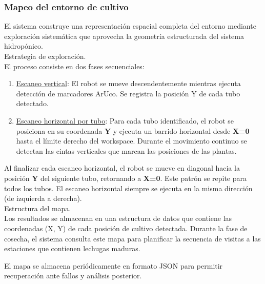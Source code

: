 \subsubsection{Mapeo del entorno de cultivo}

El sistema construye una representación espacial completa del entorno mediante exploración sistemática que aprovecha la geometría estructurada del sistema hidropónico.\\

Estrategia de exploración.\\
\noindent 
El proceso consiste en dos fases secuenciales:

\begin{enumerate}
    \item \underline{Escaneo vertical}: El robot se mueve descendentemente mientras ejecuta detección de marcadores ArUco. Se registra la posición Y de cada tubo detectado.

    \item \underline{Escaneo horizontal por tubo}: Para cada tubo identificado, el robot se posiciona en su coordenada \textbf{Y} y ejecuta un barrido horizontal desde \textbf{X=0} hasta el límite derecho del workspace. Durante el movimiento continuo se detectan las cintas verticales que marcan las posiciones de las plantas.
\end{enumerate}

Al finalizar cada escaneo horizontal, el robot se mueve en diagonal hacia la posición \textbf{Y} del siguiente tubo, retornando a \textbf{X=0}. Este patrón se repite para todos los tubos. El escaneo horizontal siempre se ejecuta en la misma dirección (de izquierda a derecha).\\

Estructura del mapa.\\
\noindent
Los resultados se almacenan en una estructura de datos que contiene las coordenadas (X, Y) de cada posición de cultivo detectada. Durante la fase de cosecha, el sistema consulta este mapa para planificar la secuencia de visitas a las estaciones que contienen lechugas maduras.

El mapa se almacena periódicamente en formato JSON para permitir recuperación ante fallos y análisis posterior.
